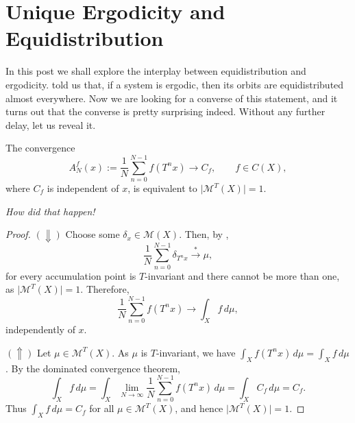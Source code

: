 \documentclass[11pt,a4paper]{article}
\begin{document}
\section*{Unique Ergodicity and Equidistribution}
In this post we shall explore the interplay between equidistribution and
ergodicity.  told us that, if a system is ergodic, then its
orbits are equidistributed almost everywhere. Now we are looking for a
converse of this statement, and it turns out that the converse is pretty
surprising indeed. Without any further delay, let us reveal it.

\setcounter{theorem}{22}\begin{theorem}\label{thm:unique-ergodicity}
The convergence
\[
  A_N^f(x):=\frac1N\sum_{n=0}^{N-1}f(T^nx)\longrightarrow C_f,
  \qquad f\in C(X),
\]
where $C_f$ is independent of $x$, is equivalent to
$\lvert\mathcal M^T(X)\rvert=1$.
\end{theorem}

\emph{How did that happen!}

\begin{proof}
$(\Downarrow)$ Choose some $\delta_x\in\mathcal M(X)$. Then, by ,
\[
  \frac1N\sum_{n=0}^{N-1}\delta_{T^nx}\overset{*}{\longrightarrow}\mu,
\]
for every accumulation point is $T$-invariant and there cannot be more than
one, as $\lvert\mathcal M^T(X)\rvert=1$. Therefore,
\[
  \frac1N\sum_{n=0}^{N-1}f(T^nx)\longrightarrow\int_X f\,d\mu,
\]
independently of $x$.

$(\Uparrow)$ Let $\mu\in\mathcal M^T(X)$. As $\mu$ is $T$-invariant, we have
$\int_X f(T^nx)\,d\mu=\int_X f\,d\mu$. By the dominated convergence theorem,
\[
  \int_X f\,d\mu
  =\int_X\lim_{N\to\infty}\frac1N\sum_{n=0}^{N-1}f(T^nx)\,d\mu
  =\int_X C_f\,d\mu=C_f.
\]
Thus $\int_X f\,d\mu=C_f$ for all $\mu\in\mathcal M^T(X)$, and hence
$\lvert\mathcal M^T(X)\rvert=1$.
\end{proof}
\end{document}
